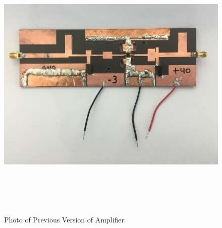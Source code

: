 \begin{figure}
  \centering
  \includegraphics[width=5in,height=5in,keepaspectratio]{figures/test/old_amp}\\
  \caption{Photo of Previous Version of Amplifier}
  \label{fig:old_amp}
\end{figure}
